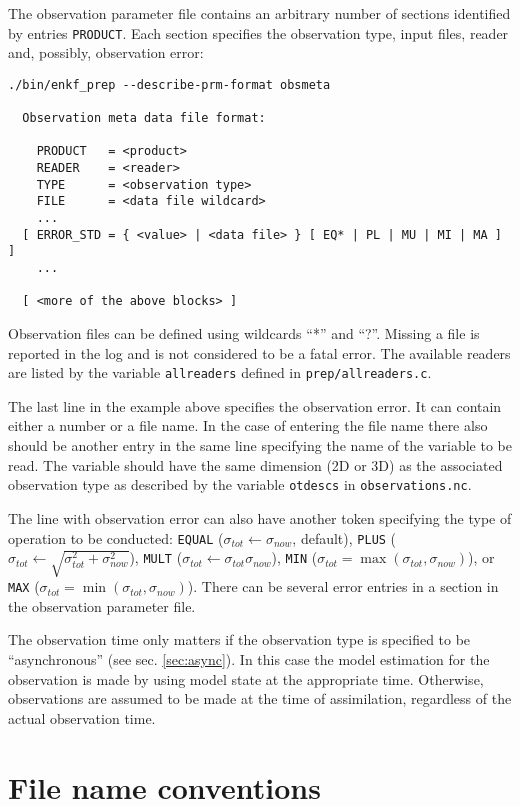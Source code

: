 \documentclass[11pt]{report}
\begin{document}
The observation parameter file contains an arbitrary number of sections identified by entries \verb|PRODUCT|.
Each section specifies the observation type, input files, reader and, possibly, observation error:
\begin{Verbatim}[frame=single,fontsize=\footnotesize]
./bin/enkf_prep --describe-prm-format obsmeta

  Observation meta data file format:

    PRODUCT   = <product>
    READER    = <reader>
    TYPE      = <observation type>
    FILE      = <data file wildcard> 
    ...
  [ ERROR_STD = { <value> | <data file> } [ EQ* | PL | MU | MI | MA ] ]
    ...

  [ <more of the above blocks> ]
\end{Verbatim}
Observation files can be defined using wildcards ``*'' and ``?''.
Missing a file is reported in the log and is not considered to be a fatal error.
The available readers are listed by the variable \verb|allreaders| defined in \verb|prep/allreaders.c|.

The last line in the example above specifies the observation error.
It can contain either a number or a file name.
In the case of entering the file name there also should be another entry in the same line specifying the name of the variable to be read.
The variable should have the same dimension (2D or 3D) as the associated observation type as described by the variable \verb|otdescs| in \verb|observations.nc|.

The line with observation error can also have another token specifying the type of operation to be conducted: \verb|EQUAL| ($\sigma_{tot} \leftarrow \sigma_{now}$, default), \verb|PLUS| ($\sigma_{tot} \leftarrow \sqrt{\sigma_{tot}^2 + \sigma_{now}^2}$), \verb|MULT| ($\sigma_{tot} \leftarrow \sigma_{tot} \sigma_{now}$), \verb|MIN| ($\sigma_{tot} = \max(\sigma_{tot}, \sigma_{now})$), or \verb|MAX| ($\sigma_{tot} = \min(\sigma_{tot}, \sigma_{now})$).
There can be several error entries in a section in the observation parameter file.

The observation time only matters if the observation type is specified to be ``asynchronous'' (see sec. \ref{sec:async}).
In this case the model estimation for the observation is made by using model state at the appropriate time.
Otherwise, observations are assumed to be made at the time of assimilation, regardless of the actual observation time.

\section{File name conventions}
\end{document}

